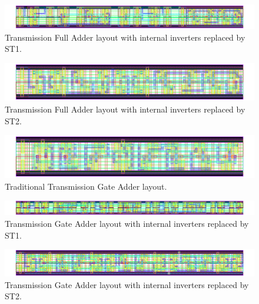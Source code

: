 \documentclass[pgmicro,mestrado,english]{iiufrgs}
\begin{document}
\newpage
\begin{figure}[H]
\centering
\includegraphics[width=1.5\textwidth, angle =90]{TFAST1.png}
\caption{Transmission Full Adder layout with internal inverters replaced by ST1.}
\label{fig:TFAST1}
\end{figure}

\newpage
\begin{figure}[H]
\centering
\includegraphics[width=1.5\textwidth, angle =90]{TFAST2.png}
\caption{Transmission Full Adder layout with internal inverters replaced by ST2.}
\label{fig:TFAST2}
\end{figure}






\newpage


\begin{figure}[H]
\centering
\includegraphics[width=1.5\textwidth, angle =90]{TGA.png}
\caption{Traditional Transmission Gate Adder layout.}
\label{fig:TGA}
\end{figure}

\newpage
\begin{figure}[H]
\centering
\includegraphics[width=1.5\textwidth, angle =90]{TGAST1.png}
\caption{Transmission Gate Adder layout with internal inverters replaced by ST1.}
\label{fig:TGAST1}
\end{figure}

\newpage
\begin{figure}[H]
\centering
\includegraphics[width=1.5\textwidth, angle =90]{TGAST2.png}
\caption{Transmission Gate Adder layout with internal inverters replaced by ST2.}
\label{fig:TGAST2}
\end{figure}
\end{document}
